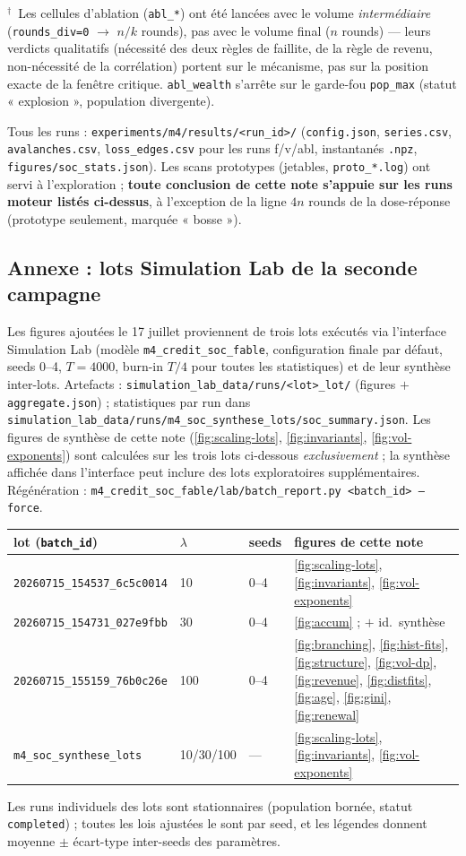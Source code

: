 \documentclass[11pt,a4paper]{article}
\newcommand{\code}[1]{\texttt{#1}}
\begin{document}
$^\dagger$~Les cellules d'ablation (\code{abl\_*}) ont été lancées avec le
volume \emph{intermédiaire} (\code{rounds\_div=0} $\to$ $n/k$ rounds), pas
avec le volume final ($n$ rounds) --- leurs verdicts qualitatifs (nécessité
des deux règles de faillite, de la règle de revenu, non-nécessité de la
corrélation) portent sur le mécanisme, pas sur la position exacte de la
fenêtre critique. \code{abl\_wealth} s'arrête sur le garde-fou
\code{pop\_max} (statut « explosion », population divergente).

Tous les runs : \code{experiments/m4/results/<run\_id>/}
(\code{config.json}, \code{series.csv}, \code{avalanches.csv},
\code{loss\_edges.csv} pour les runs f/v/abl, instantanés \code{.npz},
\code{figures/soc\_stats.json}). Les scans prototypes (jetables,
\code{proto\_*.log}) ont servi à l'exploration ; \textbf{toute conclusion de
cette note s'appuie sur les runs moteur listés ci-dessus}, à l'exception de
la ligne $4n$ rounds de la dose-réponse (prototype seulement, marquée
« bosse »).

\subsection*{Annexe : lots Simulation Lab de la seconde campagne}
\label{sec:annexe-lots}

Les figures ajoutées le 17 juillet proviennent de trois lots exécutés via
l'interface Simulation Lab (modèle \code{m4\_credit\_soc\_fable},
configuration finale par défaut, seeds 0--4, $T = 4000$, burn-in $T/4$
pour toutes les statistiques) et de leur synthèse inter-lots. Artefacts :
\code{simulation\_lab\_data/runs/<lot>\_lot/} (figures $+$
\code{aggregate.json}) ; statistiques par run dans
\code{simulation\_lab\_data/runs/m4\_soc\_synthese\_lots/soc\_summary.json}.
Les figures de synthèse de cette note
(\ref{fig:scaling-lots}, \ref{fig:invariants}, \ref{fig:vol-exponents})
sont calculées sur les trois lots ci-dessous \emph{exclusivement} ; la
synthèse affichée dans l'interface peut inclure des lots exploratoires
supplémentaires. Régénération :
\code{m4\_credit\_soc\_fable/lab/batch\_report.py <batch\_id> --force}.

{\small
\begin{tabular}{llll}
\toprule
lot (\code{batch\_id}) & $\lambda$ & seeds & figures de cette note\\
\midrule
\code{20260715\_154537\_6c5c0014} & 10 & 0--4 &
  \ref{fig:scaling-lots}, \ref{fig:invariants}, \ref{fig:vol-exponents}\\
\code{20260715\_154731\_027e9fbb} & 30 & 0--4 &
  \ref{fig:accum} ; $+$ id.\ synthèse\\
\code{20260715\_155159\_76b0c26e} & 100 & 0--4 &
  \ref{fig:branching}, \ref{fig:hist-fits}, \ref{fig:structure},
  \ref{fig:vol-dp}, \ref{fig:revenue}, \ref{fig:distfits},
  \ref{fig:age}, \ref{fig:gini}, \ref{fig:renewal}\\
\code{m4\_soc\_synthese\_lots} & 10/30/100 & --- &
  \ref{fig:scaling-lots}, \ref{fig:invariants}, \ref{fig:vol-exponents}\\
\bottomrule
\end{tabular}
}

Les runs individuels des lots sont stationnaires (population bornée,
statut \code{completed}) ; toutes les lois ajustées le sont par seed, et
les légendes donnent moyenne $\pm$ écart-type inter-seeds des paramètres.
\end{document}
